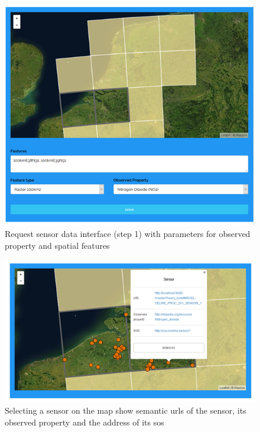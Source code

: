 \begin{figure}
	\centering
	\includegraphics[width=\linewidth]{figs/interface1.PNG}
	\caption{Request sensor data interface (step 1) with parameters for observed property and spatial features}
	\label{fig:interface1}
\end{figure}

\begin{figure}
	\centering
	\includegraphics[width=\linewidth]{figs/interface3.PNG}
	\caption{Selecting a sensor on the map show semantic \acp{url} of the sensor, its observed property and the address of its \ac{sos}}
	\label{fig:interface2}
\end{figure}

